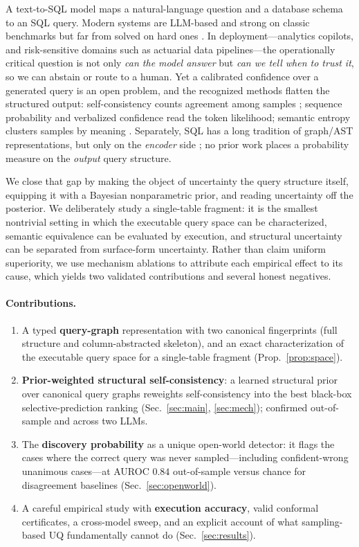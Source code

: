 \documentclass[11pt]{article}
\begin{document}
A text-to-SQL model maps a natural-language question and a database schema to an SQL query. Modern
systems are LLM-based and strong on classic benchmarks but far from solved on hard ones
\citep{lei2025spider2}. In deployment---analytics copilots, and risk-sensitive domains such as
actuarial data pipelines---the operationally critical question is not only \emph{can the model
answer} but \emph{can we tell when to trust it}, so we can abstain or route to a human. Yet a
calibrated confidence over a generated query is an open problem, and the recognized methods flatten
the structured output: self-consistency counts agreement among samples
\citep{wang2023selfconsistency}; sequence probability and verbalized confidence read the token
likelihood; semantic entropy clusters samples by meaning \citep{kuhn2023semantic,farquhar2024semantic}.
Separately, SQL has a long tradition of graph/AST representations, but only on the \emph{encoder}
side \citep{wang2020ratsql,cao2021lgesql}; no prior work places a probability measure on the
\emph{output} query structure.

We close that gap by making the object of uncertainty the query structure itself, equipping it with
a Bayesian nonparametric prior, and reading uncertainty off the posterior. We deliberately study a
single-table fragment: it is the smallest nontrivial setting in which the executable query space can
be characterized, semantic equivalence can be evaluated by execution, and structural uncertainty can
be separated from surface-form uncertainty. Rather than claim uniform superiority, we use
mechanism ablations to attribute each empirical effect to its cause, which yields two validated
contributions and several honest negatives.

\paragraph{Contributions.}
\begin{enumerate}[leftmargin=1.4em,itemsep=2pt]
  \item A typed \textbf{query-graph} representation with two canonical fingerprints (full structure
  and column-abstracted skeleton), and an exact characterization of the executable query space for a
  single-table fragment (Prop.~\ref{prop:space}).
  \item \textbf{Prior-weighted structural self-consistency}: a learned structural prior over canonical
  query graphs reweights self-consistency into the best black-box selective-prediction ranking
  (Sec.~\ref{sec:main}, \ref{sec:mech}); confirmed out-of-sample and across two LLMs.
  \item The \textbf{discovery probability} as a unique open-world detector: it flags the cases where
  the correct query was never sampled---including confident-wrong unanimous cases---at AUROC $0.84$
  out-of-sample versus chance for disagreement baselines (Sec.~\ref{sec:openworld}).
  \item A careful empirical study with \textbf{execution accuracy}, valid conformal certificates, a
  cross-model sweep, and an explicit account of what sampling-based UQ fundamentally cannot do
  (Sec.~\ref{sec:results}).
\end{enumerate}
\end{document}
